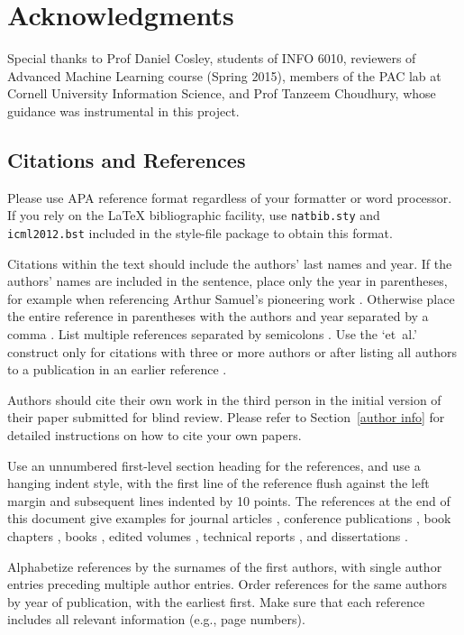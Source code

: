 \documentclass{article}
\begin{document}
\section*{Acknowledgments} 
Special thanks to Prof Daniel Cosley, students of INFO 6010, reviewers of Advanced Machine Learning course (Spring 2015), members of the PAC lab at Cornell University Information Science, and Prof Tanzeem Choudhury, whose guidance was instrumental in this project. 

 
\subsection{Citations and References} 

Please use APA reference format regardless of your formatter
or word processor. If you rely on the \LaTeX\/ bibliographic 
facility, use {\tt natbib.sty} and {\tt icml2012.bst} 
included in the style-file package to obtain this format.

Citations within the text should include the authors' last names and
year. If the authors' names are included in the sentence, place only
the year in parentheses, for example when referencing Arthur Samuel's
pioneering work . Otherwise place the entire
reference in parentheses with the authors and year separated by a
comma \cite{Samuel59}. List multiple references separated by
semicolons \cite{kearns89,Samuel59,mitchell80}. Use the `et~al.'
construct only for citations with three or more authors or after
listing all authors to a publication in an earlier reference \cite{MachineLearningI}.

Authors should cite their own work in the third person
in the initial version of their paper submitted for blind review.
Please refer to Section~\ref{author info} for detailed instructions on how to
cite your own papers.

Use an unnumbered first-level section heading for the references, and 
use a hanging indent style, with the first line of the reference flush
against the left margin and subsequent lines indented by 10 points. 
The references at the end of this document give examples for journal
articles \cite{Samuel59}, conference publications \cite{langley00}, book chapters \cite{Newell81}, books \cite{DudaHart2nd}, edited volumes \cite{MachineLearningI}, 
technical reports \cite{mitchell80}, and dissertations \cite{kearns89}. 

Alphabetize references by the surnames of the first authors, with
single author entries preceding multiple author entries. Order
references for the same authors by year of publication, with the
earliest first. Make sure that each reference includes all relevant
information (e.g., page numbers).

\nocite{langley00}



\end{document}
